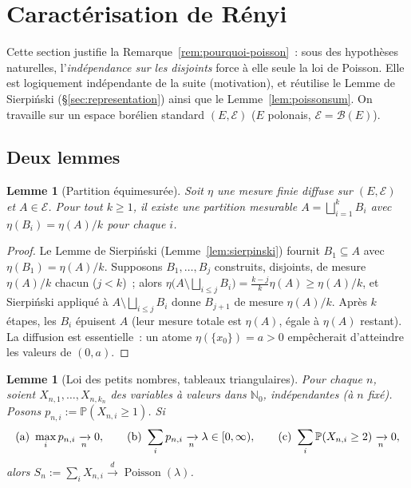 \documentclass[11pt,a4paper]{article}
\theoremstyle{plain}
\newtheorem{lemme}[theoreme]{Lemme}
\theoremstyle{definition}
\newcommand{\N}{\mathbb{N}}
\newcommand{\PP}{\mathbb{P}}
\newcommand{\Poi}{\operatorname{Poisson}}
\newcommand{\calE}{\mathcal{E}}
\newcommand{\calB}{\mathcal{B}}
\begin{document}
\section{Caractérisation de Rényi}\label{sec:renyi}

Cette section justifie la Remarque~\ref{rem:pourquoi-poisson}~: sous des hypothèses naturelles, l'\emph{indépendance sur les disjoints} force à elle seule la loi de Poisson. Elle est logiquement indépendante de la suite (motivation), et réutilise le Lemme de Sierpiński (\S\ref{sec:representation}) ainsi que le Lemme~\ref{lem:poissonsum}. On travaille sur un espace borélien standard $(E,\calE)$ ($E$ polonais, $\calE=\calB(E)$).

\subsection{Deux lemmes}

\begin{lemme}[Partition équimesurée]\label{lem:equipartition}
Soit $\eta$ une mesure finie \emph{diffuse} sur $(E,\calE)$ et $A\in\calE$. Pour tout $k\ge1$, il existe une partition mesurable $A=\bigsqcup_{i=1}^{k}B_i$ avec $\eta(B_i)=\eta(A)/k$ pour chaque $i$.
\end{lemme}

\begin{proof}
Le Lemme de Sierpiński (Lemme~\ref{lem:sierpinski}) fournit $B_1\subseteq A$ avec $\eta(B_1)=\eta(A)/k$. Supposons $B_1,\dots,B_j$ construits, disjoints, de mesure $\eta(A)/k$ chacun ($j<k$)~; alors $\eta\big(A\setminus\bigsqcup_{i\le j}B_i\big)=\frac{k-j}{k}\eta(A)\ge\eta(A)/k$, et Sierpiński appliqué à $A\setminus\bigsqcup_{i\le j}B_i$ donne $B_{j+1}$ de mesure $\eta(A)/k$. Après $k$ étapes, les $B_i$ épuisent $A$ (leur mesure totale est $\eta(A)$, égale à $\eta(A)$ restant). La diffusion est essentielle~: un atome $\eta(\{x_0\})=a>0$ empêcherait d'atteindre les valeurs de $(0,a)$.
\end{proof}

\begin{lemme}[Loi des petits nombres, tableaux triangulaires]\label{lem:petits-nombres}
Pour chaque $n$, soient $X_{n,1},\dots,X_{n,k_n}$ des variables à valeurs dans $\N_0$, \emph{indépendantes} (à $n$ fixé). Posons $p_{n,i}:=\PP(X_{n,i}\ge1)$. Si
\[
\textup{(a)}\ \max_i p_{n,i}\xrightarrow[n]{}0,\qquad
\textup{(b)}\ \sum_i p_{n,i}\xrightarrow[n]{}\lambda\in[0,\infty),\qquad
\textup{(c)}\ \sum_i \PP(X_{n,i}\ge2)\xrightarrow[n]{}0,
\]
alors $S_n:=\sum_i X_{n,i}\xrightarrow{d}\Poi(\lambda)$.
\end{lemme}
\end{document}
